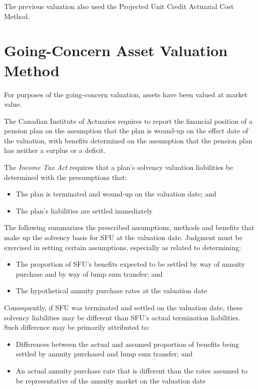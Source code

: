 \documentclass{report}
\begin{document}
\vspace{3mm}
The previous valuation also used the Projected Unit Credit Actuarial Cost Method.

\section{Going-Concern Asset Valuation Method}

For purposes of the going-concern valuation, assets have been valued at market value.

The Canadian Institute of Actuaries requires to report the financial position of a pension plan on the assumption that the plan is wound-up on the effect date of the valuation, with benefits determined on the assumption that the pension plan has neither a surplus or a deficit.

\vspace{3mm}
The \textit{Income Tax Act} requires that a plan's solvency valuation liabilities be determined with the presumptions that:
\begin{itemize}
\item The plan is terminated and wound-up on the valuation date; and
\item The plan's liabilities are settled immediately
\end{itemize}

\vspace{3mm}
The following summarizes the prescribed assumptions, methods and benefits that make up the solvency basis for SFU at the valuation date. Judgment must be exercised in setting certain assumptions, especially as related to determining:
\begin{itemize}
\item The proportion of SFU's benefits expected to be settled by way of annuity purchase and by way of lump sum transfer; and
\item The hypothetical annuity purchase rates at the valuation date
\end{itemize}

\vspace{3mm}
Consequently, if SFU was terminated and settled on the valuation date, these solvency liabilities may be different than SFU's actual termination liabilities. Such difference may be primarily attributed to:
\begin{itemize}
\item Differences between the actual and assumed proportion of benefits being settled by annuity purchased and lump sum transfer; and 
\item An actual annuity purchase rate that is different than the rates assumed to be representative of the annuity market on the valuation date
\end{itemize}
\end{document}
